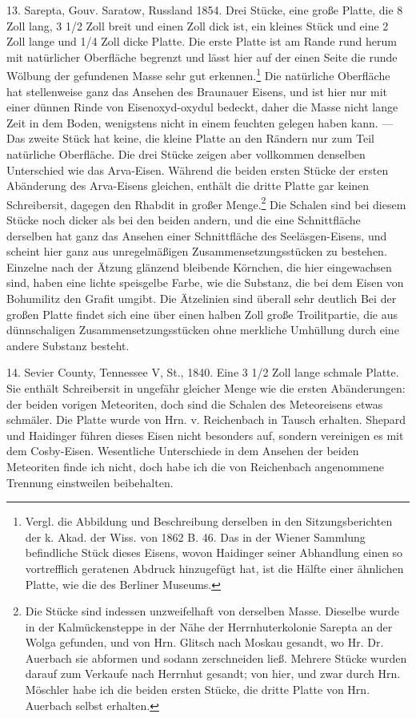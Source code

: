 \documentclass[a4paper, 11pt, oneside]{article}
\begin{document}
13. Sarepta, Gouv. Saratow, Russland 1854. Drei Stücke, eine große Platte, die 8 Zoll lang, 3 1/2 Zoll breit und einen Zoll dick ist, ein kleines Stück und eine 2 Zoll lange und 1/4 Zoll dicke Platte. Die erste Platte ist am Rande rund herum mit natürlicher Oberfläche begrenzt und lässt hier auf der einen Seite die runde Wölbung der gefundenen Masse sehr gut erkennen.\footnote{Vergl. die Abbildung und Beschreibung derselben in den Sitzungsberichten der k. Akad. der Wiss. von 1862 B. 46. Das in der Wiener Sammlung befindliche Stück dieses Eisens, wovon Haidinger seiner Abhandlung einen so vortrefflich geratenen Abdruck hinzugefügt hat, ist die Hälfte einer ähnlichen Platte, wie die des Berliner Museums.} Die natürliche Oberfläche hat stellenweise ganz das Ansehen des Braunauer Eisens, und ist hier nur mit einer dünnen Rinde von Eisenoxyd-oxydul bedeckt, daher die Masse nicht lange Zeit in dem Boden, wenigstens nicht in einem feuchten gelegen haben kann. — Das zweite Stück hat keine, die kleine Platte an den Rändern nur zum Teil natürliche Oberfläche. Die drei Stücke zeigen aber vollkommen denselben Unterschied wie das Arva-Eisen. Während die beiden ersten Stücke der ersten Abänderung des Arva-Eisens gleichen, enthält die dritte Platte gar keinen Schreibersit, dagegen den Rhabdit in großer Menge.\footnote{Die Stücke sind indessen unzweifelhaft von derselben Masse. Dieselbe wurde in der Kalmückensteppe in der Nähe der Herrnhuterkolonie Sarepta an der Wolga gefunden, und von Hrn. Glitsch nach Moskau gesandt, wo Hr. Dr. Auerbach sie abformen und sodann zerschneiden ließ. Mehrere Stücke wurden darauf zum Verkaufe nach Herrnhut gesandt; von hier, und zwar durch Hrn. Möschler habe ich die beiden ersten Stücke, die dritte Platte von Hrn. Auerbach selbst erhalten.} Die Schalen sind bei diesem Stücke noch dicker als bei den beiden andern, und die eine Schnittfläche derselben hat ganz das Ansehen einer Schnittfläche des Seeläsgen-Eisens, und scheint hier ganz aus unregelmäßigen Zusammensetzungsstücken zu bestehen. Einzelne nach der Ätzung glänzend bleibende Körnchen, die hier eingewachsen sind, haben eine lichte speisgelbe Farbe, wie die Substanz, die bei dem Eisen von Bohumilitz den Grafit umgibt. Die Ätzelinien sind überall sehr deutlich Bei der großen Platte findet sich eine über einen halben Zoll große Troilitpartie, die aus dünnschaligen Zusammensetzungsstücken ohne merkliche Umhüllung durch eine andere Substanz besteht.

14. Sevier County, Tennessee V, St., 1840. Eine 3 1/2 Zoll lange schmale Platte. Sie enthält Schreibersit in ungefähr gleicher Menge wie die ersten Abänderungen: der beiden vorigen Meteoriten, doch sind die Schalen des Meteoreisens etwas schmäler. Die Platte wurde von Hrn. v. Reichenbach in Tausch erhalten. Shepard und Haidinger führen dieses Eisen nicht besonders auf, sondern vereinigen es mit dem Cosby-Eisen. Wesentliche Unterschiede in dem Ansehen der beiden Meteoriten finde ich nicht, doch habe ich die von Reichenbach angenommene Trennung einstweilen beibehalten.
\end{document}
